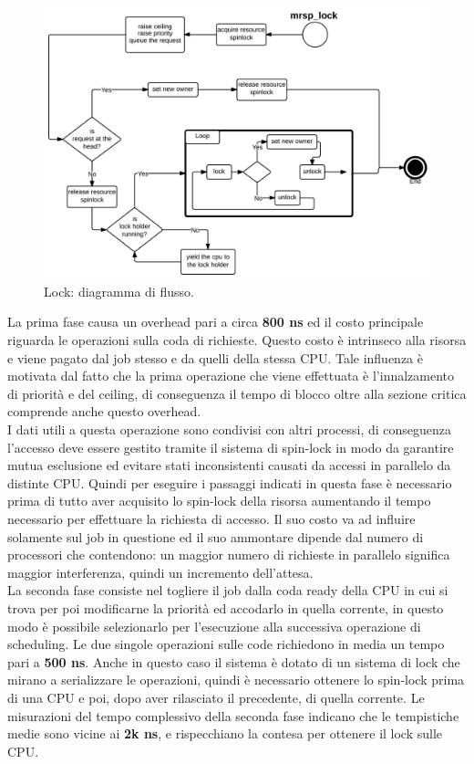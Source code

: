 {\begin{figure}
\includegraphics[width=\linewidth]{images/mrsp_lock.jpeg}
\caption{Lock: diagramma di flusso.}
\label{fig:mrsplock}
\end{figure}

\noindent La prima fase causa un overhead pari a circa \textbf{800 ns} ed il costo principale riguarda le operazioni sulla coda di richieste. Questo costo è intrinseco alla risorsa e viene pagato dal job stesso e da quelli della stessa CPU. Tale influenza è motivata dal fatto che la prima operazione che viene effettuata è l'innalzamento di priorità e del ceiling, di conseguenza il tempo di blocco oltre alla sezione critica comprende anche questo overhead.\\

\noindent I dati utili a questa operazione sono condivisi con altri processi, di conseguenza l'accesso deve essere gestito tramite il sistema di spin-lock in modo da garantire mutua esclusione ed evitare stati inconsistenti causati da accessi in parallelo da distinte CPU. Quindi per eseguire i passaggi indicati in questa fase è necessario prima di tutto aver acquisito lo spin-lock della risorsa aumentando il tempo necessario per effettuare la richiesta di accesso. Il suo costo va ad influire solamente sul job in questione ed il suo ammontare dipende dal numero di processori che contendono: un maggior numero di richieste in parallelo significa maggior interferenza, quindi un incremento dell'attesa.\\

\noindent La seconda fase consiste nel togliere il job dalla coda ready della CPU in cui si trova per poi modificarne la priorità ed accodarlo in quella corrente, in questo modo è possibile selezionarlo per l'esecuzione alla successiva operazione di scheduling. Le due singole operazioni sulle code richiedono in media un tempo pari a \textbf{500 ns}. Anche in questo caso il sistema è dotato di un sistema di lock che mirano a serializzare le operazioni, quindi è necessario ottenere lo spin-lock prima di una CPU e poi, dopo aver rilasciato il precedente, di quella corrente. Le misurazioni del tempo complessivo della seconda fase indicano che le tempistiche medie sono vicine ai \textbf{2k ns}, e rispecchiano la contesa per ottenere il lock sulle CPU.\\

}
